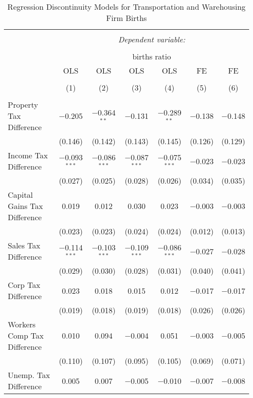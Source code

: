 
\begin{table}[!htbp] \centering 
  \caption{Regression Discontinuity Models for  Transportation and Warehousing Firm Births} 
  \label{48-49rd} 
\footnotesize 
\begin{tabular}{@{\extracolsep{5pt}}lcccccc} 
\\[-1.8ex]\hline 
\hline \\[-1.8ex] 
 & \multicolumn{6}{c}{\textit{Dependent variable:}} \\ 
\cline{2-7} 
\\[-1.8ex] & \multicolumn{6}{c}{births ratio} \\ 
 & OLS & OLS & OLS & OLS & FE & FE \\ 
\\[-1.8ex] & (1) & (2) & (3) & (4) & (5) & (6)\\ 
\hline \\[-1.8ex] 
 Property Tax Difference & $-$0.205 & $-$0.364$^{**}$ & $-$0.131 & $-$0.289$^{**}$ & $-$0.138 & $-$0.148 \\ 
  & (0.146) & (0.142) & (0.143) & (0.145) & (0.126) & (0.129) \\ 
  Income Tax Difference & $-$0.093$^{***}$ & $-$0.086$^{***}$ & $-$0.087$^{***}$ & $-$0.075$^{***}$ & $-$0.023 & $-$0.023 \\ 
  & (0.027) & (0.025) & (0.028) & (0.026) & (0.034) & (0.035) \\ 
  Capital Gains Tax Difference & 0.019 & 0.012 & 0.030 & 0.023 & $-$0.003 & $-$0.003 \\ 
  & (0.023) & (0.023) & (0.024) & (0.024) & (0.012) & (0.013) \\ 
  Sales Tax Difference & $-$0.114$^{***}$ & $-$0.103$^{***}$ & $-$0.109$^{***}$ & $-$0.086$^{***}$ & $-$0.027 & $-$0.028 \\ 
  & (0.029) & (0.030) & (0.028) & (0.031) & (0.040) & (0.041) \\ 
  Corp Tax Difference & 0.023 & 0.018 & 0.015 & 0.012 & $-$0.017 & $-$0.017 \\ 
  & (0.019) & (0.018) & (0.019) & (0.018) & (0.026) & (0.026) \\ 
  Workers Comp Tax Difference & 0.010 & 0.094 & $-$0.004 & 0.051 & $-$0.003 & $-$0.005 \\ 
  & (0.110) & (0.107) & (0.095) & (0.105) & (0.069) & (0.071) \\ 
  Unemp. Tax Difference & 0.005 & 0.007 & $-$0.005 & $-$0.010 & $-$0.007 & $-$0.008 \\ 

\end{tabular}
\end{table}
